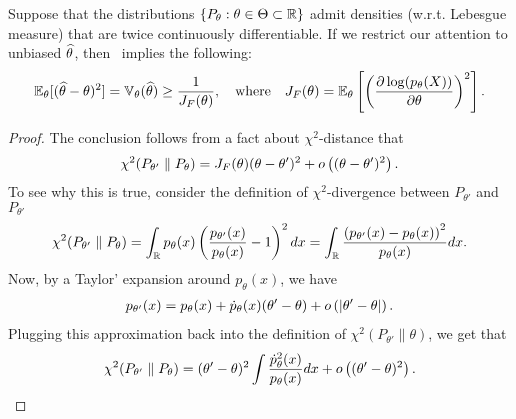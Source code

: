         \begin{corollary}
            \label{corollary:cramer-rao} Suppose that the distributions $\{P_{\theta}: \theta \in \Theta \subset \mathbb{R}\}$ admit densities (w.r.t. Lebesgue measure) that are twice continuously differentiable. If we restrict our attention to unbiased $\widehat{\theta}$, then~ implies the following: 
            \begin{align}
                \mathbb{E}_{\theta}[(\widehat{\theta}-\theta)^2] = \mathbb{V}_{\theta}(\widehat{\theta}) \geq \frac{1}{J_F(\theta)}, \quad \text{where} \quad J_F(\theta) = \mathbb{E}_{\theta}\left[ \left( \frac{\partial \log(p_{\theta}(X))}{\partial \theta} \right)^2\right]. 
            \end{align}
        \end{corollary}
        \begin{proof}
            The conclusion follows from a fact about $\chi^2$-distance that 
            \begin{align}
                \chi^2(P_{\theta'} \parallel P_{\theta}) = J_F(\theta) (\theta - \theta')^2 + o\left( (\theta - \theta')^2 \right). 
            \end{align}
            To see why this is true, consider the definition of $\chi^2$-divergence between $P_{\theta'}$ and $P_{\theta'}$ 
            \begin{align}
                \chi^2(P_{\theta'} \parallel P_{\theta}) = \int_{\mathbb{R}} p_{\theta}(x) \left( \frac{p_{\theta'}(x)}{p_{\theta}(x)} - 1 \right)^2 dx = \int_{\mathbb{R}} \frac{\left( p_{\theta'}(x) - p_{\theta}(x) \right)^2}{p_{\theta}(x)} dx. 
            \end{align}
            Now, by a Taylor' expansion around $p_{\theta}(x)$, we have 
            \begin{align}
                p_{\theta'}(x) = p_{\theta}(x) + \dot{p}_{\theta}(x) (\theta' - \theta) + o \left( |\theta'-\theta| \right). 
            \end{align}
            Plugging this approximation back into the definition of $\chi^2(P_{\theta'} \parallel \theta)$, we get that 
            \begin{align}
                \chi^2(P_{\theta'} \parallel P_{\theta}) = (\theta' - \theta)^2 \int \frac{\dot{p}_{\theta}^2(x)}{p_{\theta}(x)} dx   + o\left( (\theta'-\theta)^2 \right). 
            \end{align}
        \end{proof}

